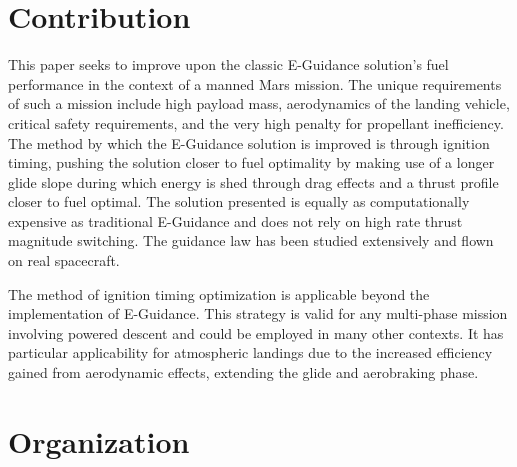\section{Contribution}
This paper seeks to improve upon the classic E-Guidance solution's fuel performance in the context of a manned Mars mission. The unique requirements of such a mission include high payload mass, aerodynamics of the landing vehicle, critical safety requirements, and the very high penalty for propellant inefficiency. The method by which the E-Guidance solution is improved is through ignition timing, pushing the solution closer to fuel optimality by making use of a longer glide slope during which energy is shed through drag effects and a thrust profile closer to fuel optimal. The solution presented is equally as computationally expensive as traditional E-Guidance and does not rely on high rate thrust magnitude switching. The guidance law has been studied extensively and flown on real spacecraft.

The method of ignition timing optimization is applicable beyond the implementation of E-Guidance. This strategy is valid for any multi-phase mission involving powered descent and could be employed in many other contexts. It has particular applicability for atmospheric landings due to the increased efficiency gained from aerodynamic effects, extending the glide and aerobraking phase.

\section{Organization}


